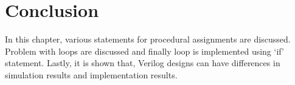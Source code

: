 \section{Conclusion}
In this chapter, various statements for procedural assignments are discussed. Problem with loops are discussed and finally loop is implemented using `if' statement. Lastly, it is shown that, Verilog designs can have differences in simulation results and implementation results. 

